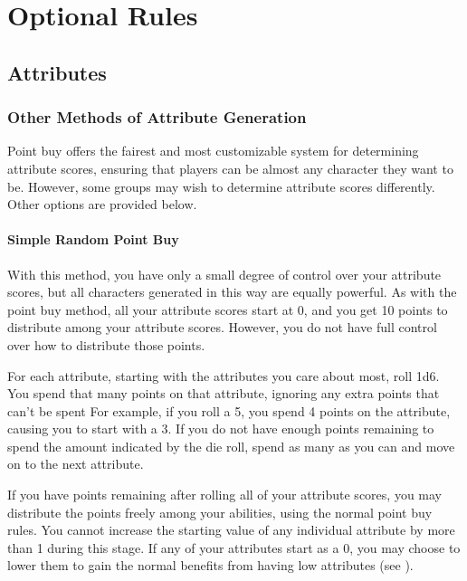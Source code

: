 \chapter{Optional Rules}

\section{Attributes}

    \subsection{Other Methods of Attribute Generation}
        Point buy offers the fairest and most customizable system for determining attribute scores, ensuring that players can be almost any character they want to be. However, some groups may wish to determine attribute scores differently. Other options are provided below.

        \subsubsection{Simple Random Point Buy}
            With this method, you have only a small degree of control over your attribute scores, but all characters generated in this way are equally powerful.
            As with the point buy method, all your attribute scores start at 0, and you get 10 points to distribute among your attribute scores.
            However, you do not have full control over how to distribute those points.

            For each attribute, starting with the attributes you care about most, roll 1d6.
            You spend that many points on that attribute, ignoring any extra points that can't be spent
            For example, if you roll a 5, you spend 4 points on the attribute, causing you to start with a 3.
            If you do not have enough points remaining to spend the amount indicated by the die roll, spend as many as you can and move on to the next attribute.

            If you have points remaining after rolling all of your attribute scores, you may distribute the points freely among your abilities, using the normal point buy rules.
            You cannot increase the starting value of any individual attribute by more than 1 during this stage.
            If any of your attributes start as a 0, you may choose to lower them to gain the normal benefits from having low attributes (see ).

